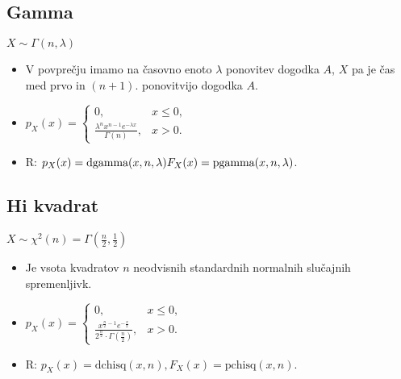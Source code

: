 \subsection{Gamma}
$X\sim \Gamma(n,\lambda)$
\begin{itemize}[leftmargin=*]
\item  V povpre\v cju imamo na \v casovno enoto $\lambda$ ponovitev dogodka $A$, $X$ pa je \v cas med prvo in $(n+1)$. ponovitvijo dogodka $A$.
\item $\displaystyle p_X(x)=
\left\{\begin{array}{ll} 
0,	&	x\leq 0,\\
\tfrac{\lambda^n x^{n-1} e^{-\lambda x}}{\Gamma(n)}, & x>0.
\end{array}\right.$
\item R: $p_X(x)=\text{dgamma}(x,n,\lambda)\\
 F_X(x)=\text{pgamma}(x,n,\lambda)$.
\end{itemize}


\subsection{Hi kvadrat}
$X\sim \chi^2(n)=\Gamma\left(\tfrac{n}{2},\tfrac{1}{2}\right)$
\begin{itemize}[leftmargin=*]
\item Je vsota kvadratov $n$ neodvisnih standardnih normalnih slu\v cajnih spremenljivk.
\item $\displaystyle p_X(x)=
\left\{\begin{array}{ll} 
0,	&	x\leq 0,\\
\tfrac{x^{\tfrac{n}{2}-1} 
e^{-\tfrac{x}{2}}}{2^{\tfrac{n}{2}}
\cdot\Gamma\left(\tfrac{n}{2}\right)},
	& x>0.
\end{array}\right.$
\item R: $p_X(x)=\text{dchisq}(x,n), F_X(x)=\text{pchisq}(x,n)$.
\end{itemize}
